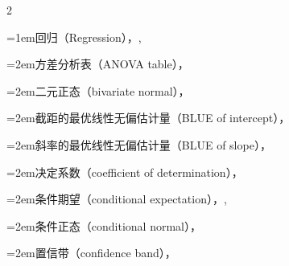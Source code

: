\begin{multicols}{2}
\par\addvspace{2pt}
\par\noindent\hangindent=1em\hspace*{0em}\label{idx:878}回归（Regression），\hyperref[idxocc:878:452]{\pageref*{idxocc:878:452}}, \hyperref[sec:11.3]{\pageref*{sec:11.3}}\par
\par\noindent\hangindent=2em\hspace*{1em}\label{idx:879}方差分析表（ANOVA table），\hyperref[tab:11.3.2]{\pageref*{tab:11.3.2}}\par
\par\noindent\hangindent=2em\hspace*{1em}\label{idx:880}二元正态（bivariate normal），\hyperref[sec:11.3.3.2]{\pageref*{sec:11.3.3.2}}\par
\par\noindent\hangindent=2em\hspace*{1em}\label{idx:881}截距的最优线性无偏估计量（BLUE of intercept），\hyperref[eq:11.3.21]{\pageref*{eq:11.3.21}}\par
\par\noindent\hangindent=2em\hspace*{1em}\label{idx:882}斜率的最优线性无偏估计量（BLUE of slope），\hyperref[eq:11.3.19]{\pageref*{eq:11.3.19}}\par
\par\noindent\hangindent=2em\hspace*{1em}\label{idx:883}决定系数（coefficient of determination），\hyperref[idxocc:883:481]{\pageref*{idxocc:883:481}}\par
\par\noindent\hangindent=2em\hspace*{1em}\label{idx:884}条件期望（conditional expectation），\hyperref[exercise:4.13]{\pageref*{exercise:4.13}}, \hyperref[eq:11.3.3]{\pageref*{eq:11.3.3}}\par
\par\noindent\hangindent=2em\hspace*{1em}\label{idx:885}条件正态（conditional normal），\hyperref[sec:11.3.3.1]{\pageref*{sec:11.3.3.1}}\par
\par\noindent\hangindent=2em\hspace*{1em}\label{idx:886}置信带（confidence band），\hyperref[idxocc:886:485]{\pageref*{idxocc:886:485}}\par

\end{multicols}
